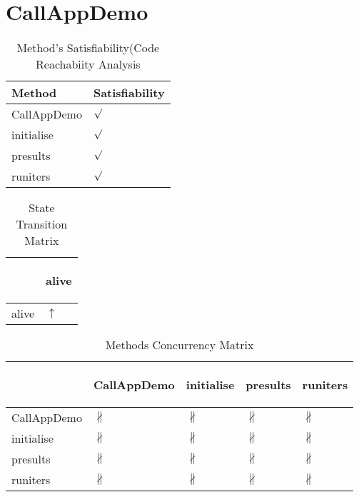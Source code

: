 \documentclass[10pt]{article}
\begin{document}
\section{{\color{Fuchsia}CallAppDemo}}
\label{CallAppDemo}
\begin{longtable}{|l|l|}
\caption{Method's Satisfiability(Code Reachabiity Analysis}\\
\hline
Method & Satisfiability\\
\hline
CallAppDemo&{\color{blue}$\surd$}\\
\hline
initialise&{\color{blue}$\surd$}\\
\hline
presults&{\color{blue}$\surd$}\\
\hline
runiters&{\color{blue}$\surd$}\\
\hline
\end{longtable}
\begin{longtable}{|l|l|}
\caption{State Transition Matrix}\\
\hline
&\begin{sideways}alive\end{sideways}\\
\hline
alive&{\color{blue}$\uparrow$}\\
\hline
\end{longtable}
\begin{longtable}{|l|l|l|l|l|}
\caption{Methods Concurrency Matrix}\\
\hline
&\begin{sideways}CallAppDemo\end{sideways}&\begin{sideways}initialise\end{sideways}&\begin{sideways}presults\end{sideways}&\begin{sideways}runiters\end{sideways}\\
\hline
CallAppDemo&{\color{BrickRed}$\nparallel$}&{\color{BrickRed}$\nparallel$}&{\color{BrickRed}$\nparallel$}&{\color{BrickRed}$\nparallel$}\\
\hline
initialise&{\color{BrickRed}$\nparallel$}&{\color{BrickRed}$\nparallel$}&{\color{BrickRed}$\nparallel$}&{\color{BrickRed}$\nparallel$}\\
\hline
presults&{\color{BrickRed}$\nparallel$}&{\color{BrickRed}$\nparallel$}&{\color{BrickRed}$\nparallel$}&{\color{BrickRed}$\nparallel$}\\
\hline
runiters&{\color{BrickRed}$\nparallel$}&{\color{BrickRed}$\nparallel$}&{\color{BrickRed}$\nparallel$}&{\color{BrickRed}$\nparallel$}\\
\hline
\end{longtable}
\newpage
\end{document}
